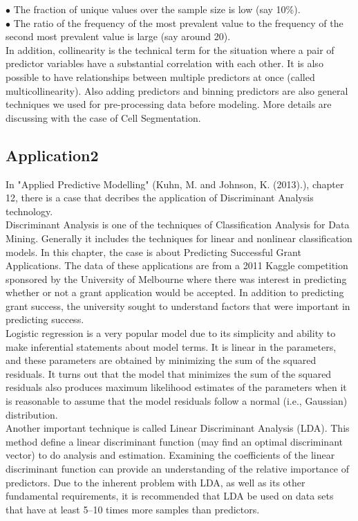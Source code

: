 \documentclass{article}%
\begin{document}
\indent $\bullet$ The fraction of unique values over the sample size is low (say 10\%).\\
\indent $\bullet$ The ratio of the frequency of the most prevalent value to the frequency of the second most prevalent value is large (say around 20).\\
\indent In addition, collinearity is the technical term for the situation where a pair of predictor variables have a substantial correlation with each other. It is also
possible to have relationships between multiple predictors at once (called multicollinearity).
\indent Also adding predictors and binning predictors are also general techniques we used for pre-processing data before modeling. More details are discussing with the case of Cell Segmentation.

\subsection{Application2}
In "Applied Predictive Modelling" (Kuhn, M. and Johnson, K. (2013).), chapter 12, there is a case that decribes the application of Discriminant Analysis technology. \\
\indent Discriminant Analysis is one of the techniques of Classification Analysis for Data Mining. Generally it includes the techniques for linear and nonlinear classification models. In this chapter, the case is about Predicting Successful Grant Applications. The data of these applications are from a 2011 Kaggle competition sponsored by the University of Melbourne where there was interest in predicting whether or not a grant application would be accepted. In addition to predicting grant success, the university sought to understand factors that were important in predicting success.\\
\indent Logistic regression is a very popular model due to its simplicity and ability to make inferential statements about model terms. It is linear in the parameters, and these parameters are obtained by minimizing the sum of the squared residuals. It turns out that the model that minimizes the sum of the squared residuals also produces maximum likelihood estimates of the parameters when it is reasonable to assume that the model residuals follow a normal (i.e., Gaussian) distribution. \\
\indent Another important technique is called Linear Discriminant Analysis (LDA). This method define a linear discriminant function (may find an optimal discriminant vector) to do analysis and estimation. Examining the coefficients of the linear discriminant function can provide an understanding of the relative importance of predictors. Due to the inherent problem with LDA, as well as its other fundamental requirements, it is recommended that LDA be used on data sets that have at least 5–10 times more samples than predictors.\\
\end{document}
